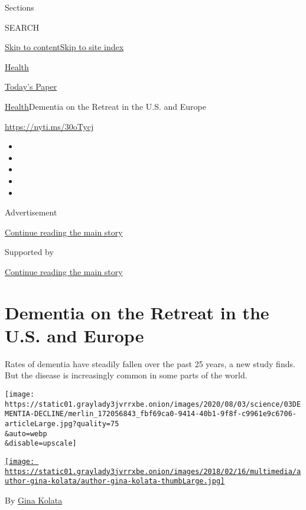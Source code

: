 Sections

SEARCH

\protect\hyperlink{site-content}{Skip to
content}\protect\hyperlink{site-index}{Skip to site index}

\href{https://www.nytimes3xbfgragh.onion/section/health}{Health}

\href{https://myaccount.nytimes3xbfgragh.onion/auth/login?response_type=cookie\&client_id=vi}{}

\href{https://www.nytimes3xbfgragh.onion/section/todayspaper}{Today's
Paper}

\href{/section/health}{Health}\textbar{}Dementia on the Retreat in the
U.S. and Europe

\url{https://nyti.ms/30oTycj}

\begin{itemize}
\item
\item
\item
\item
\item
\end{itemize}

Advertisement

\protect\hyperlink{after-top}{Continue reading the main story}

Supported by

\protect\hyperlink{after-sponsor}{Continue reading the main story}

\hypertarget{dementia-on-the-retreat-in-the-us-and-europe}{%
\section{Dementia on the Retreat in the U.S. and
Europe}\label{dementia-on-the-retreat-in-the-us-and-europe}}

Rates of dementia have steadily fallen over the past 25 years, a new
study finds. But the disease is increasingly common in some parts of the
world.

\texttt{[image: https://static01.graylady3jvrrxbe.onion/images/2020/08/03/science/03DEMENTIA-DECLINE/merlin\_172056843\_fbf69ca0-9414-40b1-9f8f-c9961e9c6706-articleLarge.jpg?quality=75\\\&auto=webp\\\&disable=upscale]}

\href{https://www.nytimes3xbfgragh.onion/by/gina-kolata}{\texttt{[image: https://static01.graylady3jvrrxbe.onion/images/2018/02/16/multimedia/author-gina-kolata/author-gina-kolata-thumbLarge.jpg]}}

By \href{https://www.nytimes3xbfgragh.onion/by/gina-kolata}{Gina Kolata}

